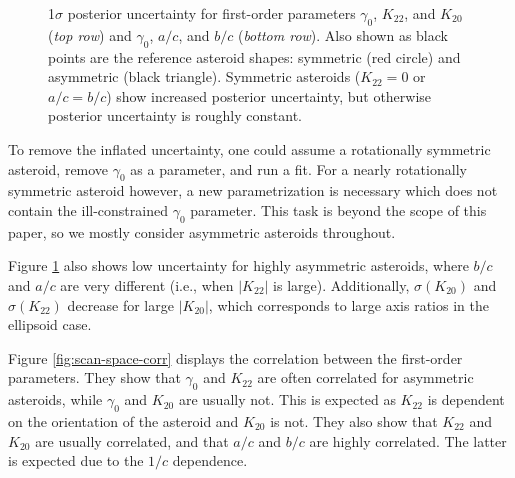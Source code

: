 \documentclass[fleqn,usenatbib]{mnras}
\begin{document}
\begin{figure}
  \caption{1$\sigma$ posterior uncertainty for first-order parameters $\gamma_0$, $K_{22}$, and $K_{20}$ (\textit{top row}) and $\gamma_0$, $a/c$, and $b/c$ (\textit{bottom row}). Also shown as black points are the reference asteroid shapes: symmetric (red circle) and asymmetric (black triangle). Symmetric asteroids ($K_{22}=0$ or $a/c=b/c$) show increased posterior uncertainty, but otherwise posterior uncertainty is roughly constant.}
  \label{fig:scan-space-sigma}
\end{figure}

To remove the inflated uncertainty, one could assume a rotationally symmetric asteroid, remove $\gamma_0$ as a parameter, and run a fit. For a nearly rotationally symmetric asteroid however, a new parametrization is necessary which does not contain the ill-constrained $\gamma_0$ parameter. This task is beyond the scope of this paper, so we mostly consider asymmetric asteroids throughout.

Figure \ref{fig:scan-space-sigma} also shows low uncertainty for highly asymmetric asteroids, where $b/c$ and $a/c$ are very different (i.e., when $|K_{22}|$ is large). Additionally, $\sigma(K_{20})$ and $\sigma(K_{22})$ decrease for large $|K_{20}|$, which corresponds to large axis ratios in the ellipsoid case.

Figure \ref{fig:scan-space-corr} displays the correlation between the first-order parameters. They show that $\gamma_0$ and $K_{22}$ are often correlated for asymmetric asteroids, while $\gamma_0$ and $K_{20}$ are usually not. This is expected as $K_{22}$ is dependent on the orientation of the asteroid and $K_{20}$ is not. They also show that $K_{22}$ and $K_{20}$ are usually correlated, and that $a/c$ and $b/c$ are highly correlated. The latter is expected due to the $1/c$ dependence.
\end{document}
